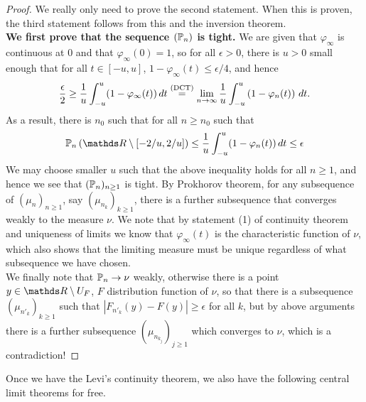 \begin{unexaminable}
\begin{proof}
We really only need to prove the second statement. When this is proven, the third statement follows from this and the inversion theorem. \\ 

\textbf{We first prove that the sequence $(\mathbb{P}_n)$ is tight.} We are given that $\varphi_\infty$ is continuous at 0 and that $\varphi_\infty(0) = 1$, so for all $\epsilon > 0$, there is $u > 0$ small enough that for all $t \in [-u,u]$, $1 - \varphi_\infty(t) \leq \epsilon / 4$, and hence 
\begin{equation}
\frac{\epsilon}{2} \geq \frac{1}{u} \int_{-u}^u (1-\varphi_\infty(t)) \, dt \overset{\text{(DCT)}}{=} \lim_{n\to\infty} \frac{1}{u} \int_{-u}^u \left( 1-\varphi_n(t) \right) \, dt.
\end{equation}
As a result, there is $n_0$ such that for all $n \geq n_0$ such that 
\begin{equation}
\p_n\bracket{\R\setminus [-2/u,2/u]} \leq \frac{1}{u} \int_{-u}^u (1-\varphi_n(t)) \, dt \leq \epsilon
\end{equation}
We may choose smaller $u$ such that the above inequality holds for all $n \geq 1$, and hence we see that $(\mathbb{P}_n)_{n\geq 1}$ is tight. By Prokhorov theorem, for any subsequence of $(\mu_n)_{n\geq 1}$, say $(\mu_{n_k})_{k\geq 1}$, there is a further subsequence that converges weakly to the measure $\nu$. We note that by statement (1) of continuity theorem and uniqueness of limits we know that $\varphi_\infty(t)$ is the characteristic function of $\nu$, which also shows that the limiting measure must be unique regardless of what subsequence we have chosen. \\

We finally note that $\mathbb{P}_n \to \nu$ weakly, otherwise there is a point $y \in \R\setminus U_F$, $F$ distribution function of $\nu$, so that there is a subsequence $(\mu_{n'_k})_{k\geq 1}$ such that $|F_{n'_k}(y) - F(y)| \geq \epsilon$ for all $k$, but by above arguments there is a further subsequence $(\mu_{n_{k_j}})_{j\geq 1}$ which converges to $\nu$, which is a contradiction!
\end{proof}
\end{unexaminable}

Once we have the Levi's continuity theorem, we also have the following central limit theorems for free.

